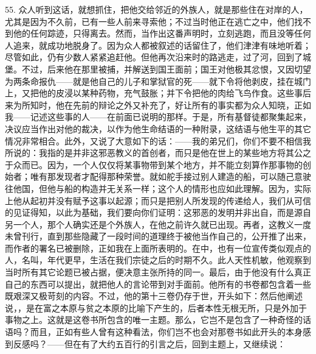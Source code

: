 55. 众人听到这话，就想抓住，把他交给邻近的外族人，就是那些住在对岸的人，尤其是因为不久前，已有一些人前来寻索他；不过当时他正在逃亡之中，他们找不到他的任何踪迹，只得离去。然而，当作出这番声明时，立刻逃跑，而且没等任何人追来，就成功地脱身了。因为众人都被叙述的话留住了，他们津津有味地听着；尽管如此，仍有少数人紧紧追赶他。但他再次沿来时的路逃走，过了河，回到了城堡。不过，后来他在那里被捕，并解送到国王面前；国王对他极其忿恨，又因切望为两条命报仇——就是他自己的儿子和掌狱官的死——就下令将他剥皮，挂在城门上，又把他的皮浸以某种药物，充气鼓胀；并下令把他的肉给飞鸟作食。这些事后来为所知时，他在先前的辩论之外又补充了，好让所有的事实都为众人知晓，正如我——记述这些事的人——在前面已说明的那样。于是，所有基督徒都聚集起来，决议应当作出对他的裁决，以作为他生命结语的一种附录，这结语与他生平的其它情况非常相合。此外，又说了大意如下的话：——我的弟兄们，你们不要不相信我所说的：我指的是并非这邪恶教义的首创者，而只是他在世上的某些地方将其公之于众而已。因为，一个人仅仅将某事物带到某个地方，并不能立刻算作那事物的创始者；唯有那发现者才配得那种荣誉。就如舵手接过别人建造的船，可以随己意驶往他国，但他与船的构造并无关系一样；这个人的情形也应如此理解。因为，实际上他从起初并没有赋予这事以起源；而只是把别人所发现的传递给人，我们从可信的见证得知，以此为基础，我们要向你们证明：这邪恶的发明并非出自，而是源自另一个人，那个人确实还是个外族人，在他之前许久就已出现。再者，这教义一度未曾刊行，直到那些隐藏了一段时间的道理终于被他当作自己的，公开推了出来，而作者的署名已被删除，正如我在上面所表明的。在中，也有一位宣传类似观点的人，名叫，年代更早，生活在我们宗徒之后的时期不久。此人天性机敏，他观察到当时所有其它论题已被占据，便决意主张所持的同一。最后，由于他没有什么真正自己的东西可以提出，就把他人的言论带到对手面前。他所有的书卷都包含着一些既艰深又极苛刻的内容。不过，他的第十三卷仍存于世，开头如下：然后他阐述说，，是在富之本原与贫之本原的比喻下产生的，后者本性无根无所，只是外加于事物之上。这就是这卷书所包含的唯一主题。那么，它岂不是包含了一种奇怪的话语吗？而且，正如有些人曾有这种看法，你们岂不也会对那卷书如此开头的本身感到反感吗？——但在有了大约五百行的引言之后，回到主题上，又继续说：\par

